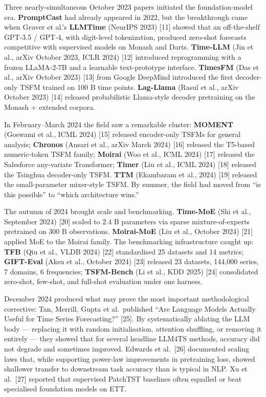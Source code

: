 Three nearly-simultaneous October 2023 papers initiated the foundation-model era. \textbf{PromptCast} had already appeared in 2022, but the breakthrough came when Gruver et al.'s \textbf{LLMTime} (NeurIPS 2023) {[}11{]} showed that an off-the-shelf GPT-3.5 / GPT-4, with digit-level tokenization, produced zero-shot forecasts competitive with supervised models on Monash and Darts. \textbf{Time-LLM} (Jin et al., arXiv October 2023, ICLR 2024) {[}12{]} introduced reprogramming with a frozen LLaMA-2-7B and a learnable text-prototype interface. \textbf{TimesFM} (Das et al., arXiv October 2023) {[}13{]} from Google DeepMind introduced the first decoder-only TSFM trained on 100 B time points. \textbf{Lag-Llama} (Rasul et al., arXiv October 2023) {[}14{]} released probabilistic Llama-style decoder pretraining on the Monash + extended corpora.

In February--March 2024 the field saw a remarkable cluster: \textbf{MOMENT} (Goswami et al., ICML 2024) {[}15{]} released encoder-only TSFMs for general analysis; \textbf{Chronos} (Ansari et al., arXiv March 2024) {[}16{]} released the T5-based numeric-token TSFM family; \textbf{Moirai} (Woo et al., ICML 2024) {[}17{]} released the Salesforce any-variate Transformer; \textbf{Timer} (Liu et al., ICML 2024) {[}18{]} released the Tsinghua decoder-only TSFM. \textbf{TTM} (Ekambaram et al., 2024) {[}19{]} released the small-parameter mixer-style TSFM. By summer, the field had moved from ``is this possible'' to ``which architecture wins.''

The autumn of 2024 brought scale and benchmarking. \textbf{Time-MoE} (Shi et al., September 2024) {[}20{]} scaled to 2.4 B parameters via sparse mixture-of-experts pretrained on 300 B observations. \textbf{Moirai-MoE} (Liu et al., October 2024) {[}21{]} applied MoE to the Moirai family. The benchmarking infrastructure caught up: \textbf{TFB} (Qiu et al., VLDB 2024) {[}22{]} standardised 25 datasets and 14 metrics; \textbf{GIFT-Eval} (Aksu et al., October 2024) {[}23{]} released 23 datasets, 144,000 series, 7 domains, 6 frequencies; \textbf{TSFM-Bench} (Li et al., KDD 2025) {[}24{]} consolidated zero-shot, few-shot, and full-shot evaluation under one harness.

December 2024 produced what may prove the most important methodological corrective: Tan, Merrill, Gupta et al.~published ``Are Language Models Actually Useful for Time Series Forecasting?'' {[}25{]}. By systematically ablating the LLM body --- replacing it with random initialisation, attention shuffling, or removing it entirely --- they showed that for several headline LLM4TS methods, accuracy did not degrade and sometimes improved. Edwards et al.~{[}26{]} documented scaling laws that, while supporting power-law improvements in pretraining loss, showed shallower transfer to downstream task accuracy than is typical in NLP. Xu et al.~{[}27{]} reported that supervised PatchTST baselines often equalled or beat specialised foundation models on ETT.


